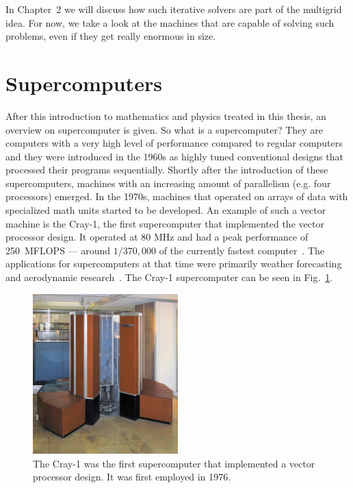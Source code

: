 In Chapter~2 we will discuss how such iterative solvers are part of the multigrid idea. For now, we take a look at the machines that are capable of solving such problems, even if they get really enormous in size.



\section{Supercomputers}
After this introduction to mathematics and physics treated in this thesis, an overview on supercomputer is given. So what is a supercomputer? They are computers with a very high level of performance compared to regular computers and they were introduced in the 1960s as highly tuned conventional designs that processed their programs sequentially. Shortly after the introduction of these supercomputers, machines with an increasing amount of parallelism (e.g. four processors) emerged. In the 1970s, machines that operated on arrays of data with specialized math units started to be developed. An example of such a vector machine is the Cray-1, the first supercomputer that implemented the vector processor design. It operated at 80 MHz and had a peak performance of 250~MFLOPS --- around $1/370,000$ of the currently fastest computer~\cite{russell1978cray,top500sunway}. The applications for supercomputers at that time were primarily weather forecasting and aerodynamic research~\cite{russell1978cray}. The Cray-1 supercomputer can be seen in Fig.~\ref{fig:cray_1}.

\begin{figure}[h]
	\centering
	\includegraphics[width=0.5\textwidth]{chapters/chapter01/cray-1.jpg}
	\caption{The Cray-1 was the first supercomputer that implemented a vector processor design. It was first employed in 1976.} %
	\label{fig:cray_1}
\end{figure}

